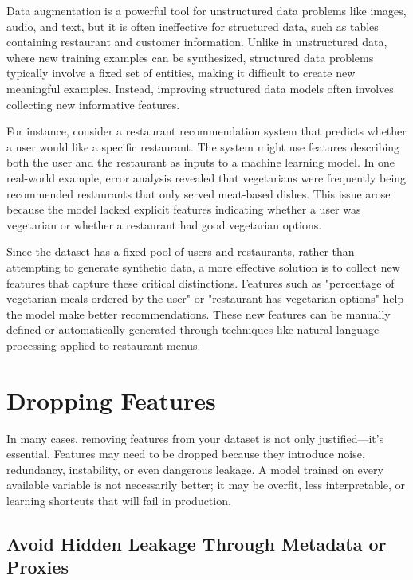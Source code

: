 \documentclass[12pt,openany]{book}
\begin{document}
Data augmentation is a powerful tool for unstructured data problems like images, audio, and text, but it is often ineffective for structured data, such as tables containing restaurant and customer information. Unlike in unstructured data, where new training examples can be synthesized, structured data problems typically involve a fixed set of entities, making it difficult to create new meaningful examples. Instead, improving structured data models often involves collecting new informative features. \newline

\begin{examplebox}
For instance, consider a restaurant recommendation system that predicts whether a user would like a specific restaurant. The system might use features describing both the user and the restaurant as inputs to a machine learning model. In one real-world example, error analysis revealed that vegetarians were frequently being recommended restaurants that only served meat-based dishes. This issue arose because the model lacked explicit features indicating whether a user was vegetarian or whether a restaurant had good vegetarian options.
\end{examplebox} 

Since the dataset has a fixed pool of users and restaurants, rather than attempting to generate synthetic data, a more effective solution is to collect new features that capture these critical distinctions. Features such as "percentage of vegetarian meals ordered by the user" or "restaurant has vegetarian options" help the model make better recommendations. These new features can be manually defined or automatically generated through techniques like natural language processing applied to restaurant menus. 



\section{Dropping Features}

In many cases, removing features from your dataset is not only justified—it’s essential. Features may need to be dropped because they introduce noise, redundancy, instability, or even dangerous leakage. A model trained on every available variable is not necessarily better; it may be overfit, less interpretable, or learning shortcuts that will fail in production.

\subsection{Avoid Hidden Leakage Through Metadata or Proxies}
\end{document}

